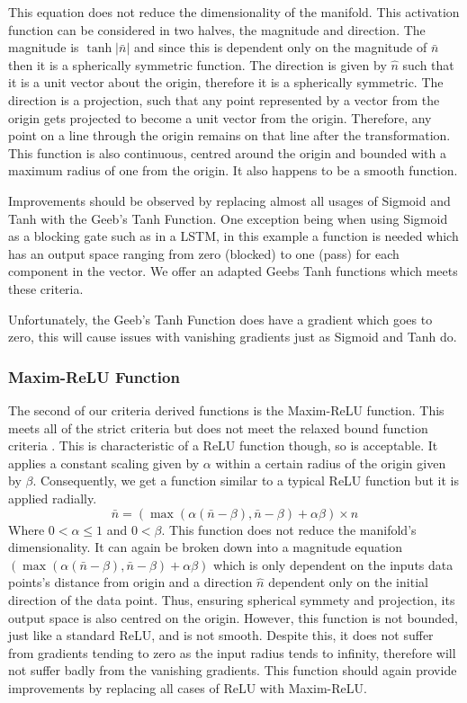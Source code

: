 \documentclass[onecolumn]{article}
\begin{document}
    This equation does not reduce the dimensionality of the manifold. This activation function can be considered in two halves, the magnitude and direction. The magnitude is $\tanh|\bar{n}|$ and since this is dependent only on the magnitude of $\bar{n}$ then it is a spherically symmetric function. The direction is given by $\hat{n}$ such that it is a unit vector about the origin, therefore it is a spherically symmetric. The direction is a projection, such that any point represented by a vector from the origin gets projected to become a unit vector from the origin. Therefore, any point on a line through the origin remains on that line after the transformation. This function is also continuous, centred around the origin and bounded with a maximum radius of one from the origin. It also happens to be a smooth function.
      
    Improvements should be observed by replacing almost all usages of Sigmoid and Tanh with the Geeb's Tanh Function. One exception being when using Sigmoid as a blocking gate such as in a LSTM, in this example a function is needed which has an output space ranging from zero (blocked) to one (pass) for each component in the vector. We offer an adapted Geebs Tanh functions which meets these criteria.
    
    Unfortunately, the Geeb's Tanh Function does have a gradient which goes to zero, this will cause issues with vanishing gradients just as Sigmoid and Tanh do.

    \subsubsection{Maxim-ReLU Function}

    The second of our criteria derived functions is the Maxim-ReLU function. This meets all of the strict criteria but does not meet the relaxed bound function criteria . This is characteristic of a ReLU function though, so is acceptable. It applies a constant scaling given by $\alpha$ within a certain radius of the origin given by $\beta$. Consequently, we get a function similar to a typical ReLU function but it is applied radially.
    \begin{equation}
        \label{eqn:Maxim-ReLU Function}
        \bar{n}=\left(\max\left(\alpha\left(\bar{n}-\beta\right),\bar{n}-\beta\right)+\alpha\beta\right)\times\hat{n} 
    \end{equation}
    Where ${0} < \alpha \leq {1}$ and ${0} < \beta$. This function does not reduce the manifold's dimensionality. It can again be broken down into a magnitude equation $\left(\max\left(\alpha\left(\bar{n}-\beta\right),\bar{n}-\beta\right)+\alpha\beta\right)$ which is only dependent on the inputs data points's distance from origin and a direction $\hat{n}$ dependent only on the initial direction of the data point. Thus, ensuring spherical symmety and projection, its output space is also centred on the origin. However, this function is not bounded, just like a standard ReLU, and is not smooth. Despite this, it does not suffer from gradients tending to zero as the input radius tends to infinity, therefore will not suffer badly from the vanishing gradients. This function should again provide improvements by replacing all cases of ReLU with Maxim-ReLU.
    
\end{document}
